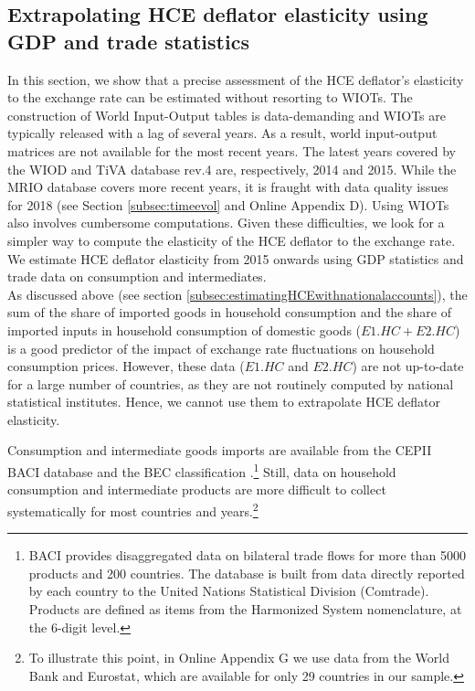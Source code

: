 \documentclass[11pt,a4paper]{paper} %
\begin{document}
\subsection{Extrapolating HCE deflator elasticity using GDP and trade statistics}\label{sec:Extrapolations}
In this section, we show that a precise assessment of the HCE deflator's elasticity to the exchange rate can be estimated without resorting to WIOTs. 
The construction of World Input-Output tables is data-demanding and WIOTs are typically released with a lag of several years.
As a result, world input-output matrices are not available for the most recent years.
The latest years covered by the WIOD and TiVA database rev.4 are, respectively, 2014 and 2015. 
While the MRIO database covers more recent years, it is fraught with data quality issues for 2018 (see Section \ref{subsec:timeevol} and Online Appendix D).
Using WIOTs also involves cumbersome computations.
Given these difficulties, we look for a simpler way to compute the elasticity of the HCE deflator to the exchange rate.
We estimate HCE deflator elasticity from 2015 onwards using GDP statistics and trade data on consumption and intermediates.\\
As discussed above (see section \ref{subsec:estimatingHCEwithnationalaccounts}), the sum of the share of imported goods in household consumption and the share of imported inputs in household consumption of domestic goods ($E1.HC + E2.HC$) is a good predictor of the impact of exchange rate fluctuations on household consumption prices. 
However, these data ($E1.HC$ and $E2.HC$) are not up-to-date for a large number of countries, as they are not routinely computed by national statistical institutes.
Hence, we cannot use them to extrapolate HCE deflator elasticity.

Consumption and intermediate goods imports are available from the CEPII BACI database and the BEC classification \citep{Gaulier2010}.\footnote{BACI provides disaggregated data on bilateral trade flows for more than 5000 products and 200 countries. The database is built from data directly reported by each country to the United Nations Statistical Division (Comtrade). Products are defined as items from the Harmonized System nomenclature, at the 6-digit level.}
Still, data on household consumption and intermediate products are more difficult to collect systematically for most countries and years.\footnote{To illustrate this point, in Online Appendix G we use data from the World Bank and Eurostat, which are available for only 29 countries in our sample.}
\end{document}
